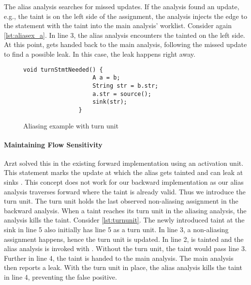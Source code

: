 \documentclass[../draft.tex]{subfiles}
\begin{document}
    The alias analysis searches for missed updates.
    If the analysis found an update, e.g., the taint is on the left side of the assignment, the analysis injects the edge to the statement with the taint into the main analysis' worklist.
    Consider again \autoref{lst:aliasex_a}.
    In line 3, the alias analysis encounters the tainted  on the left side.
    At this point,  gets handed back to the main analysis, following the missed update to find a possible leak. In this case, the leak happens right away.

    \begin{figure}[tbp]
        \centering
        \begin{adjustbox}{max width=\columnwidth}
            \begin{lstlisting}[gobble=16]
                void turnStmtNeeded() {
                    A a = b;
                    String str = b.str;
                    a.str = source();
                    sink(str);
                }
            \end{lstlisting}
        \end{adjustbox}
        \caption{Aliasing example with turn unit}
        \label{lst:turnunit}
    \end{figure}

    \paragraph{Maintaining Flow Sensitivity}
    Arzt solved this in the existing forward implementation using an activation unit.
    This statement marks the update at which the alias gets tainted and can leak at sinks \cite{Arzt2017PhD}.
    This concept does not work for our backward implementation as our alias analysis traverses forward where the taint is already valid.
    Thus we introduce the turn unit.
    The turn unit holds the last observed non-aliasing assignment in the backward analysis.
    When a taint reaches its turn unit in the aliasing analysis, the analysis kills the taint.
    Consider \autoref{lst:turnunit}.
    The newly introduced taint  at the sink in line 5 also initially has line 5 as a turn unit.
    In line 3, a non-aliasing assignment happens, hence the turn unit is updated.
    In line 2,  is tainted and the alias analysis is invoked with .
    Without the turn unit, the taint would pass line 3.
    Further in line 4, the taint is handed to the main analysis.
    The main analysis then reports a leak.
    With the turn unit in place, the alias analysis kills the taint in line 4, preventing the false positive.
\end{document}
